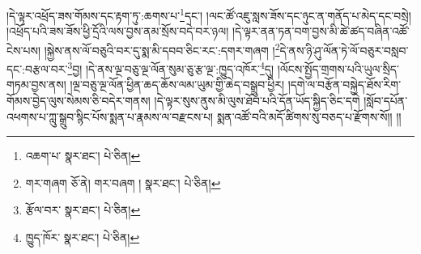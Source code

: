 །དེ་ལྟར་འཕྲོད་ཟས་གོམས་དང་རྟག་ཏུ་:ཆགས་པ་\footnote{འཆག་པ་  སྣར་ཐང་།  པེ་ཅིན། }དང་། །ལང་ཚོ་འཇུ་སླས་ཟོས་དང་ཉུང་ན་གནོད་པ་མེད་དང་བསྲེ། །འཕྲོད་པའི་ཟས་ཟོས་ཕྱི་དྲོའི་ལས་བྱས་ནམ་སྲོས་བདེ་བར་ཉལ། །དེ་ལྟར་ནན་ཏན་བག་བྱས་མི་ཚེ་ཚད་བཞིན་འཚོ་ངེས་པས། །སྐྱེས་ནས་ལོ་བཅུའི་བར་དུ་སྨ་མི་དབབ་ཅིང་རང་:དགར་གཞག །\footnote{གར་གཞག   ཅོ་ནེ། གར་བཞག །  སྣར་ཐང་།  པེ་ཅིན། }དེ་ནས་ཉི་ཤུ་ལོན་ཏེ་ལོ་བཅུར་བསླབ་དང་:བརྩལ་བར་\footnote{རྩོལ་བར་  སྣར་ཐང་།  པེ་ཅིན། }བྱ། །དེ་ནས་ལྔ་བཅུ་ལྔ་ལོན་སུམ་ཅུ་རྩ་ལྔ་:ཁྱུད་འཁོར་\footnote{ཁྱུད་ཁོར་  སྣར་ཐང་།  པེ་ཅིན། }དུ། །ལོངས་སྤྱོད་གྲགས་པའི་ཡུལ་སྲིད་གཏམ་བྱས་ནས། །ལྔ་བཅུ་ལྔ་ལོན་ཕྱིན་ཆད་ཆོས་ལམ་ཡུམ་གྱི་ཆེད་བསྒྲུབ་ཕྱིར། །དགེ་ལ་བརྩོན་བསྐྱེད་ཐོས་རིག་གོམས་བྱེད་ལུས་སེམས་ཅི་བདེར་གནས། །དེ་ལྟར་སུས་ནུས་མི་ལུས་ཐོབ་པའི་དོན་ཡོད་སྐྱིད་ཅིང་དགེ །སློབ་དཔོན་འཕགས་པ་ཀླུ་སྒྲུབ་སྙིང་པོས་སྨན་པ་རྣམས་ལ་བརྫངས་པ། སྨན་འཚོ་བའི་མདོ་ཚིགས་སུ་བཅད་པ་རྫོགས་སོ།། །།